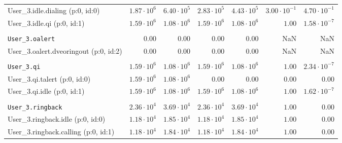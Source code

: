\begin{table}[htbp]
{\begin{tabular}{lrrrrrr}
\hspace{3mm}User\_3.idle.dialing (p:0, id:0)          & $1.87 \cdot 10^{6}$ & $6.40 \cdot 10^{5}$ & $2.83 \cdot 10^{5}$ & $4.43 \cdot 10^{5}$ & $3.00 \cdot 10^{-1}$ & $4.70 \cdot 10^{-1}$ \\
\hspace{3mm}User\_3.idle.qi (p:0, id:1)               & $1.59 \cdot 10^{6}$ & $1.08 \cdot 10^{6}$ & $1.59 \cdot 10^{6}$ & $1.08 \cdot 10^{6}$ &               $1.00$ & $1.58 \cdot 10^{-7}$ \\
\\[-8pt]\texttt{User\_3.oalert}                       &              $0.00$ &              $0.00$ &              $0.00$ &              $0.00$ &                  NaN &                  NaN \\
\hspace{3mm}User\_3.oalert.dveoringout (p:0, id:2)    &              $0.00$ &              $0.00$ &              $0.00$ &              $0.00$ &                  NaN &                  NaN \\
\\[-8pt]\texttt{User\_3.qi}                           & $1.59 \cdot 10^{6}$ & $1.08 \cdot 10^{6}$ & $1.59 \cdot 10^{6}$ & $1.08 \cdot 10^{6}$ &               $1.00$ & $2.34 \cdot 10^{-7}$ \\
\hspace{3mm}User\_3.qi.talert (p:0, id:0)             & $1.59 \cdot 10^{6}$ & $1.08 \cdot 10^{6}$ &              $0.00$ &              $0.00$ &               $0.00$ &               $0.00$ \\
\hspace{3mm}User\_3.qi.idle (p:0, id:1)               & $1.59 \cdot 10^{6}$ & $1.08 \cdot 10^{6}$ & $1.59 \cdot 10^{6}$ & $1.08 \cdot 10^{6}$ &               $1.00$ & $1.62 \cdot 10^{-7}$ \\
\\[-8pt]\texttt{User\_3.ringback}                     & $2.36 \cdot 10^{4}$ & $3.69 \cdot 10^{4}$ & $2.36 \cdot 10^{4}$ & $3.69 \cdot 10^{4}$ &               $1.00$ &               $0.00$ \\
\hspace{3mm}User\_3.ringback.idle (p:0, id:0)         & $1.18 \cdot 10^{4}$ & $1.85 \cdot 10^{4}$ & $1.18 \cdot 10^{4}$ & $1.85 \cdot 10^{4}$ &               $1.00$ &               $0.00$ \\
\hspace{3mm}User\_3.ringback.calling (p:0, id:1)      & $1.18 \cdot 10^{4}$ & $1.84 \cdot 10^{4}$ & $1.18 \cdot 10^{4}$ & $1.84 \cdot 10^{4}$ &               $1.00$ &               $0.00$ \\

\end{tabular}}
\end{table}
